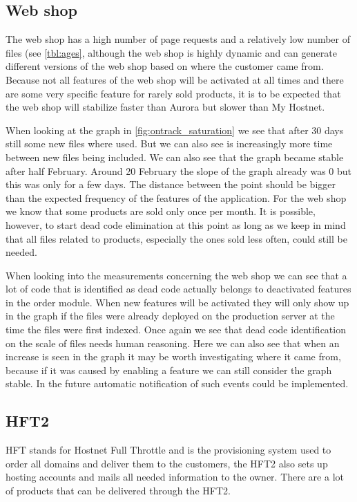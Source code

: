 \subsection*{Web shop}

The web shop has a high number of page requests and a relatively low number of files (see \autoref{tbl:ages}, although the web shop is highly dynamic and can generate different versions of the web shop based on where the customer came from. Because not all features of the web shop will be activated at all times and there are some very specific feature for rarely sold products, it is to be expected that the web shop will stabilize faster than Aurora but slower than My Hostnet.

When looking at the graph in \autoref{fig:ontrack_saturation} we see that after 30 days still some new files where used. But we can also see is increasingly more time between new files being included. We can also see that the graph became stable after half February. Around 20 February the slope of the graph already was 0 but this was only for a few days. The distance between the point should be bigger than the expected frequency of the features of the application. For the web shop we know that some products are sold only once per month. It is possible, however, to start dead code elimination at this point as long as we keep in mind that all files related to products, especially the ones sold less often, could still be needed.

When looking into the measurements concerning the web shop we can see that a lot of code that is identified as dead code actually belongs to deactivated features in the order module. When new features will be activated they will only show up in the graph if the files were already deployed on the production server at the time the files were first indexed. Once again we see that dead code identification on the scale of files needs human reasoning. Here we can also see that when an increase is seen in the graph it may be worth investigating where it came from, because if it was caused by enabling a feature we can still consider the graph stable. In the future automatic notification of such events could be implemented.

\subsection*{HFT2}
HFT stands for Hostnet Full Throttle and is the provisioning system used to order all domains and deliver them to the customers, the HFT2 also sets up hosting accounts and mails all needed information to the owner. There are a lot of products that can be delivered through the HFT2. 

